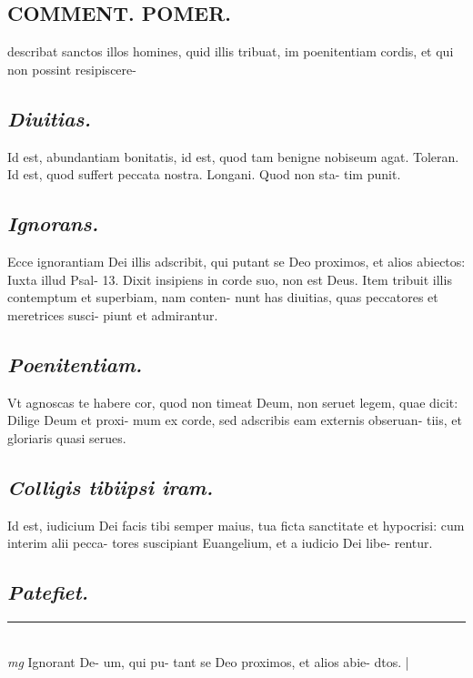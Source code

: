 \documentclass{article}
\begin{document}
\begin{pages}
\section*{COMMENT. POMER.  }\pstart describat sanctos illos homines, quid illis tribuat, im poenitentiam cordis, et qui non possint resipiscere-  \pend
{}
{}
\subsection*{\textit{Diuitias. }}\pstart Id est, abundantiam bonitatis, id est, quod tam benigne nobiseum agat. Toleran. Id est, quod suffert peccata nostra. Longani. Quod non sta- tim punit.   \pend
{}
{}
\subsection*{\textit{Ignorans. }}\pstart Ecce ignorantiam Dei illis adscribit, qui putant se Deo proximos, et alios abiectos: Iuxta illud Psal- 13. Dixit insipiens in corde suo, non est Deus. Item tribuit illis contemptum et superbiam, nam conten- nunt has diuitias, quas peccatores et meretrices susci- piunt et admirantur.   \pend
{}
{}
\subsection*{\textit{Poenitentiam. }}\pstart Vt agnoscas te habere cor, quod non timeat Deum, non seruet legem, quae dicit: Dilige Deum et proxi- mum ex corde, sed adscribis eam externis obseruan- tiis, et gloriaris quasi serues.   \pend
{}
{}
\subsection*{\textit{Colligis tibiipsi iram. }}\pstart Id est, iudicium Dei facis tibi semper maius, tua ficta sanctitate et hypocrisi: cum interim alii pecca- tores suscipiant Euangelium, et a iudicio Dei libe- rentur.   \pend
{}
{}
\subsection*{\textit{Patefiet. }}
\vspace{0.5cm}\noindent
\vspace{0.2cm}\rule{1cm}{0.2pt}\\ 
\hspace{0.2cm}\textit{mg}
\footnotesize Ignorant De- um, qui pu- tant se Deo proximos, et alios abie- dtos.  
\normalsize| 

\end{pages}
\end{document}
